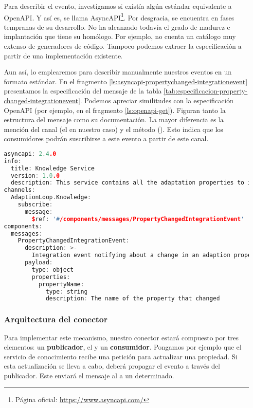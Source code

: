 Para describir el evento, investigamos si existía algún estándar equivalente a OpenAPI. Y así es, se llama AsyncAPI\footnote{Página oficial: \url{https://www.asyncapi.com/}}. Por desgracia, se encuentra en fases tempranas de su desarrollo. No ha alcanzado todavía el grado de madurez e implantación que tiene su homólogo. Por ejemplo, no cuenta un catálogo muy extenso de generadores de código. Tampoco podemos extraer la especificación a partir de una implementación existente.

Aun así, lo emplearemos para describir manualmente nuestros eventos en un formato estándar. En el fragmento \ref{ls:asyncapi-propertychanged-integrationevent} presentamos la especificación del mensaje de la tabla \ref{tab:especificacion-property-changed-integrationevent}. Podemos apreciar similitudes con la especificación OpenAPI (por ejemplo, en el fragmento \ref{ls:openapi-get}). Figuran tanto la estructura del mensaje como su documentación. La mayor diferencia es la mención del canal (el   en nuestro caso) y el método (). Esto indica que los consumidores podrán suscribirse a este evento a partir de este canal.

\pagebreak

\begin{lstlisting}[language={C++},caption={Ejemplo del evento de integración \emph{builder}.},captionpos=b, label=ls:asyncapi-propertychanged-integrationevent]
asyncapi: 2.4.0
info:
  title: Knowledge Service
  version: 1.0.0
  description: This service contains all the adaptation properties to inform the different stages of the loop.
channels:
  AdaptionLoop.Knowledge:
    subscribe:
      message:
        $ref: '#/components/messages/PropertyChangedIntegrationEvent'
components:
  messages:
    PropertyChangedIntegrationEvent:
      description: >-
        Integration event notifying about a change in an adaption property.
      payload:
        type: object
        properties:
          propertyName:
            type: string
            description: The name of the property that changed
\end{lstlisting}

\subsubsection{Arquitectura del conector}

Para implementar este mecanismo, nuestro conector estará compuesto por tres elementos: un \textbf{publicador}, el \textbf{} y un \textbf{consumidor}. Pongamos por ejemplo que el servicio de conocimiento recibe una petición para actualizar una propiedad. Si esta actualización se lleva a cabo, deberá propagar el evento a través del publicador. Este enviará el mensaje al  a un  determinado.

